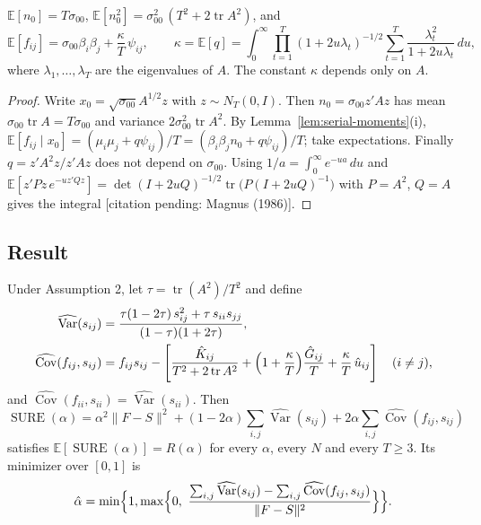 \begin{lemma}\label{lem:serial-uncond}
$\mathbb{E}[n_0] = T\sigma_{00}$, $\mathbb{E}[n_0^2] = \sigma_{00}^2\,(T^2 + 2\operatorname{tr}A^2)$, and
\[
  \mathbb{E}[f_{ij}] = \sigma_{00}\beta_i\beta_j + \frac{\kappa}{T}\,\psi_{ij}, \qquad
  \kappa = \mathbb{E}[q] = \int_0^\infty \prod_{t=1}^T (1 + 2u\lambda_t)^{-1/2} \sum_{t=1}^T \frac{\lambda_t^2}{1 + 2u\lambda_t}\, du,
\]
where $\lambda_1, \dots, \lambda_T$ are the eigenvalues of $A$. The constant $\kappa$ depends only on $A$.
\end{lemma}

\begin{proof}
Write $x_0 = \sqrt{\sigma_{00}}A^{1/2}z$ with $z \sim N_T(0, I)$. Then $n_0 = \sigma_{00}z'Az$ has mean $\sigma_{00}\operatorname{tr}A = T\sigma_{00}$ and variance $2\sigma_{00}^2\operatorname{tr}A^2$. By Lemma~\ref{lem:serial-moments}(i), $\mathbb{E}[f_{ij} \mid x_0] = (\mu_i\mu_j + q\psi_{ij})/T = (\beta_i\beta_jn_0 + q\psi_{ij})/T$; take expectations. Finally $q = z'A^2z/z'Az$ does not depend on $\sigma_{00}$. Using $1/a = \int_0^\infty e^{-ua}\,du$ and $\mathbb{E}[z'Pz\,e^{-u z'Qz}] = \det(I + 2uQ)^{-1/2}\operatorname{tr}\bigl(P(I + 2uQ)^{-1}\bigr)$ with $P = A^2$, $Q = A$ gives the integral [citation pending: Magnus (1986)].
\end{proof}

\subsection{Result}

\begin{theorem}\label{thm:serial}
Under Assumption 2, let $\tau = \operatorname{tr}(A^2)/T^2$ and define
\begin{align*}
  \widehat{\operatorname{Var}}(s_{ij}) &= \frac{\tau(1 - 2\tau)\,s_{ij}^2 + \tau\,s_{ii}s_{jj}}{(1 - \tau)(1 + 2\tau)}, \\
  \widehat{\operatorname{Cov}}(f_{ij}, s_{ij}) &= f_{ij}s_{ij} - \left[\frac{\hat K_{ij}}{T^2 + 2\operatorname{tr}A^2} + \Bigl(1 + \frac{\kappa}{T}\Bigr)\frac{\hat G_{ij}}{T} + \frac{\kappa}{T}\,\hat u_{ij}\right] \quad (i \neq j),
\end{align*}
and $\widehat{\operatorname{Cov}}(f_{ii}, s_{ii}) = \widehat{\operatorname{Var}}(s_{ii})$. Then
\[
  \operatorname{SURE}(\alpha) = \alpha^2\|F - S\|^2 + (1 - 2\alpha)\sum_{i,j}\widehat{\operatorname{Var}}(s_{ij}) + 2\alpha\sum_{i,j}\widehat{\operatorname{Cov}}(f_{ij}, s_{ij})
\]
satisfies $\mathbb{E}[\operatorname{SURE}(\alpha)] = R(\alpha)$ for every $\alpha$, every $N$ and every $T \geq 3$. Its minimizer over $[0,1]$ is
\[
  \hat\alpha = \min\Bigl\{1, \max\Bigl\{0,\ \frac{\sum_{i,j}\widehat{\operatorname{Var}}(s_{ij}) - \sum_{i,j}\widehat{\operatorname{Cov}}(f_{ij}, s_{ij})}{\|F - S\|^2}\Bigr\}\Bigr\}.
\]
\end{theorem}

